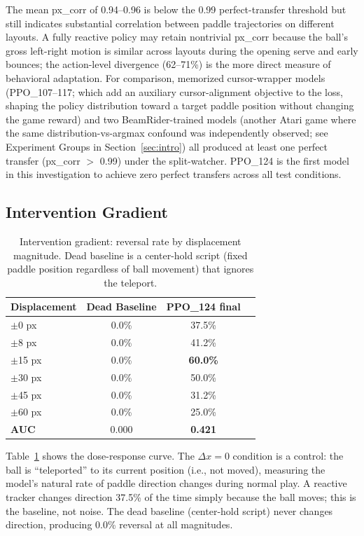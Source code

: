 \documentclass[11pt]{article}
\begin{document}
The mean px\_corr of 0.94--0.96 is below the 0.99 perfect-transfer threshold
but still indicates substantial correlation between paddle trajectories on
different layouts. A fully reactive policy may retain nontrivial px\_corr
because the ball's gross left-right motion is similar across layouts during the
opening serve and early bounces; the action-level divergence (62--71\%) is the
more direct measure of behavioral adaptation. For comparison, memorized
cursor-wrapper models (PPO\_107--117; which add an auxiliary cursor-alignment
objective to the loss, shaping the policy distribution toward a target paddle
position without changing the game reward) and two BeamRider-trained models
(another Atari game where the same distribution-vs-argmax confound was
independently observed; see Experiment Groups in Section~\ref{sec:intro})
all produced at least one perfect transfer (px\_corr $>$ 0.99) under the
split-watcher. PPO\_124 is the first model in this investigation to achieve
zero perfect transfers across all test conditions.

\subsection{Intervention Gradient}

\begin{table}[ht]
\centering
\begin{tabular}{lccc}
\toprule
\textbf{Displacement} & \textbf{Dead Baseline} & \textbf{PPO\_124 final} \\
\midrule
$\pm$0 px   & 0.0\% & 37.5\% \\
$\pm$8 px   & 0.0\% & 41.2\% \\
$\pm$15 px  & 0.0\% & \textbf{60.0\%} \\
$\pm$30 px  & 0.0\% & 50.0\% \\
$\pm$45 px  & 0.0\% & 31.2\% \\
$\pm$60 px  & 0.0\% & 25.0\% \\
\midrule
\textbf{AUC} & 0.000 & \textbf{0.421} \\
\bottomrule
\end{tabular}
\caption{Intervention gradient: reversal rate by displacement magnitude.
Dead baseline is a center-hold script (fixed paddle position regardless of
ball movement) that ignores the teleport.}
\label{tab:intervention}
\end{table}

Table~\ref{tab:intervention} shows the dose-response curve. The $\Delta x=0$
condition is a control: the ball is ``teleported'' to its current position
(i.e., not moved), measuring the model's natural rate of paddle direction
changes during normal play. A reactive tracker changes direction 37.5\% of the
time simply because the ball moves; this is the baseline, not noise. The dead
baseline (center-hold script) never changes direction, producing 0.0\%
reversal at all magnitudes.
\end{document}
